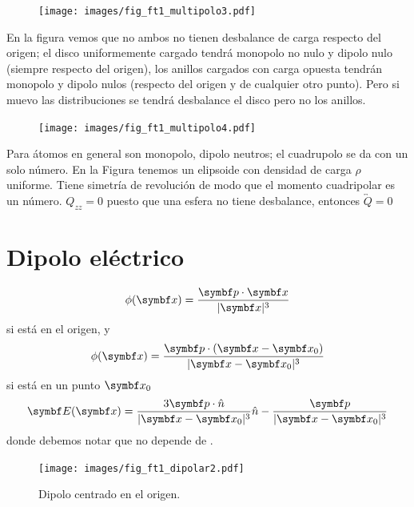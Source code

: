 \documentclass[10pt,oneside]{CBFT_book}
\begin{document}
\begin{figure}[htb]
	\begin{center}
	\texttt{[image: images/fig\_ft1\_multipolo3.pdf]}	 
	\end{center}
	\caption{}
\end{figure}

En la figura vemos que no ambos no tienen desbalance de carga respecto del origen; el disco uniformemente
cargado tendrá monopolo no nulo y dipolo nulo (siempre respecto del origen), los anillos cargados con carga
opuesta tendrán monopolo y dipolo nulos (respecto del origen y de cualquier otro punto). Pero si muevo las
distribuciones se tendrá desbalance el disco pero no los anillos.

\begin{figure}[htb]
	\begin{center}
	\texttt{[image: images/fig\_ft1\_multipolo4.pdf]}	 
	\end{center}
	\caption{}
\end{figure}

Para átomos en general son monopolo, dipolo neutros; el cuadrupolo se da con un solo número. 
En la Figura tenemos un elipsoide con densidad de carga $\rho$ uniforme. Tiene simetría de revolución
de modo que el momento cuadripolar es un número. $Q_{zz} = 0 $ puesto que una esfera no tiene
desbalance, entonces $\overleftrightarrow{Q} = 0 $ 


\section{Dipolo eléctrico}

\[
	\phi(\vb{x}) = \frac{ \vb{p}\cdot\vb{x} }{|\vb{x}|^3} 
\]
si está en el origen, y
\[
	\phi(\vb{x}) = \frac{ \vb{p}\cdot(\vb{x}-\vb{x}_0) }{|\vb{x} - \vb{x}_0|^3} 
\]
si está en un punto $\vb{x}_0$
\[
	\vb{E}(\vb{x}) = \frac{3 \vb{p}\cdot\hat{n} }{|\vb{x} - \vb{x}_0|^3}  \hat{n} - 
		\frac{ \vb{p} }{|\vb{x} - \vb{x}_0|^3}	
\]
donde debemos notar que  no depende de .

\begin{figure}[htb]
	\begin{center}
	\texttt{[image: images/fig\_ft1\_dipolar2.pdf]}	 
	\end{center}
	\caption{Dipolo centrado en el origen.}
\end{figure}
\end{document}
